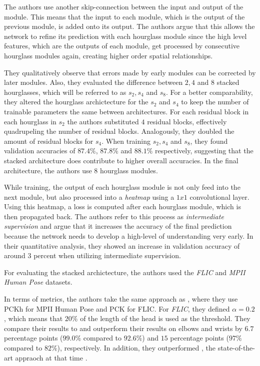 The authors use another skip-connection between the input and output of the module.
This means that the input to each module, which is the output of the previous module, is added onto its output.
The authors argue that this allows the network to refine its prediction with each hourglass module since the high level features, which are the outputs of each module, get processed by consecutive hourglass modules again, creating higher order spatial relationships.

They qualitatively observe that errors made by early modules can be corrected by later modules.
Also, they evaluated the difference between $2, 4$ and $8$ stacked hourglasses, which will be referred to as $s_2, s_4$ and $s_8$.
For a better comparability, they altered the hourglass archictecture for the $s_2$ and $s_4$ to keep the number of trainable parameters the same between architectures.
For each residual block in each hourglass in $s_2$ the authors substituted $4$ residual blocks, effectively quadrupeling the number of residual blocks.
Analogously, they doubled the amount of residual blocks for $s_4$.
When training $s_2, s_4$ and $s_8$, they found validation accuracies of $87.4\%$, $87.8\%$ and $88.1\%$ respectively, suggesting that the stacked architecture does contribute to higher overall accuracies.
In the final architecture, the authors use $8$ hourglass modules.

While training, the output of each hourglass module is not only feed into the next module, but also processed into a \textit{heatmap} using a $1x1$ convolutional layer.
Using this heatmap, a loss is computed after each hourglass module, which is then propagated back.
The authors refer to this process as \textit{intermediate supervision} and argue that it increases the accuracy of the final prediction because the network needs to develop a high-level of understanding very early.
In their quantitative analysis, they showed an increase in validation accuracy of around $3$ percent when utilizing intermediate supervision. 

For evaluating the stacked archictecture, the authors used the \textit{FLIC}  and \textit{MPII Human Pose} \cite{andriluka_2d_2014} datasets.

In terms of metrics, the authors take the same approach as \cite{wei_convolutional_2016}, where they use PCKh for MPII Human Pose and PCK for FLIC.
For \textit{FLIC}, they defined $\alpha = 0.2$, which means that $20\%$ of the length of the head is used as the threshold.
They compare their results to \cite{toshev_deeppose:_2014} and outperform their results on elbows and wrists by $6.7$ percentage points ($99.0\%$ compared to $92.6\%$) and $15$ percentage points ($97\%$ compared to $82\%$), respectively.
In addition, they outperformed \cite{wei_convolutional_2016}, the state-of-the-art appraoch at that time .


